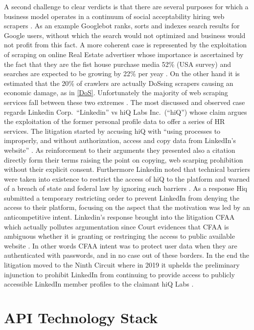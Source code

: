 \documentclass[
  12pt,
  a4paper,
  oneside]{book}
\theoremstyle{definition}
\theoremstyle{definition}
\theoremstyle{definition}
\theoremstyle{remark}
\begin{document}
A second challenge to clear verdicts is that there are several purposes for which a business model operates in a continuum of social acceptability hiring web scrapers \citep{ADetaile90}. As an example Googlebot ranks, sorts and indexes search results for Google users, without which the search would not optimized and business would not profit from this fact. A more coherent case is represented by the exploitation of scraping on online Real Estate advertiser whose importance is ascertained by the fact that they are the fist house purchase media 52\% (USA survey) and searches are expected to be growing by 22\% per yeay \citep{peterson2003consumer}. On the other hand it is estimated that the 20\% of crawlers are actually DoSsing scrapers \citep{TheInter5} causing an economic damage, as in \ref{DoS}. Unfortunately the majority of web scraping services fall between these two extremes \citeyearpar{WhatCour57}.
The most discussed and observed case regards Linkedin Corp.~``Linkedin'' vs hiQ Labs Inc.~(``hiQ'') whose claim argues the exploitation of the former personal profile data to offer a series of HR services. The litigation started by accusing hiQ with ``using processes to improperly, and without authorization, access and copy data from LinkedIn's website'' \citep{Letterfr71}. As reinforcement to their arguments they presented also a citation directly form their terms raising the point on copying, web scarping prohibition without their explicit consent. Furthermore Linkedin noted that technical barriers were taken into existence to restrict the access of hiQ to the platform and warned of a breach of state and federal law by ignoring such barriers \citeyearpar{WhatCour57}. As a response Hiq submitted a temporary restricting order to prevent LinkedIn from denying the access to their platform, focusing on the aspect that the motivation was led by an anticompetitive intent. Linkedin's response brought into the litigation CFAA which actually pollutes argumentation since Court evidences that CFAA is ambiguous whether it is granting or restringing the access to public available website \citep{hiQLabsI66}. In other words CFAA intent was to protect user data when they are authenticated with passwords, and in no case out of these borders. In the end the litigation moved to the Ninth Circuit where in 2019 it uphelds the preliminary injunction to prohibit LinkedIn from continuing to provide access to publicly accessible LinkedIn member profiles to the claimant hiQ Labs \citep{wiki:HiQvsLinkedIn}.

\hypertarget{Infrastructure}{%
\chapter{API Technology Stack}\label{Infrastructure}}
\end{document}
